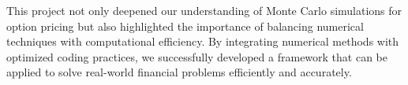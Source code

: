 This project not only deepened our understanding of Monte Carlo simulations for option pricing but also highlighted the importance of balancing numerical techniques with computational efficiency. By integrating numerical methods with optimized coding practices, we successfully developed a framework that can be applied to solve real-world financial problems efficiently and accurately.
